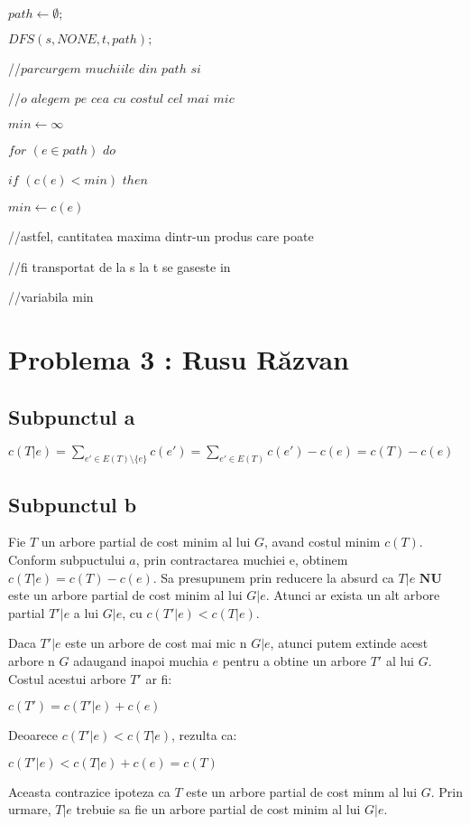 \documentclass{article}
\begin{document}
{{{    \\
    \par $path \leftarrow \emptyset;$
    \par $DFS(s, NONE, t, path);$
    \\
    \par //$parcurgem$ $muchiile$ $din$ $path$ $si$ 
    \par //$o$ $alegem$ $pe$ $cea$ $cu$ $costul$ $cel$ $mai$ $mic$
    \par $min \leftarrow \infty$
    \par $for$  $(e\in path)$ $do$
    \par \hspace*{1cm} $if$ $(c(e)<min)$ $then$
    \par \hspace*{1.5cm} $min \leftarrow c(e)$
    \par //astfel, cantitatea maxima dintr-un produs care poate
    \par //fi transportat de la s la t se gaseste in 
    \par //variabila min 

}

\section*{\fontsize{20}{50}\selectfont Problema 3 : Rusu Răzvan}
\subsection*{\fontsize{16}{30}\selectfont Subpunctul a}
{\fontsize{14}{16}\selectfont 

\centerline {$ c(T|e) = \sum_{ e'\in E(T)\setminus \lbrace e \rbrace } c(e') = \sum_{ e'\in E(T) } c(e') - c(e) = c(T) - c(e)$ }
}

\subsection*{\fontsize{16}{30}\selectfont Subpunctul b}
{\fontsize{14}{16}\selectfont 
    Fie $T$ un arbore partial de cost minim al lui $G$, avand costul minim $c(T)$. Conform subpuctului $a$, prin contractarea muchiei e, obtinem $c(T|e) = c(T) - c(e)$.
    Sa presupunem prin reducere la absurd ca $T|e$ $\mathbf{N} \mathbf{U}$ este un arbore partial de cost minim al lui $G|e$. Atunci ar exista un alt arbore partial $T'|e$ a lui $G|e$, cu $c(T'|e) < c(T|e)$.
    \par Daca $T'|e$ este un arbore de cost mai mic n $G|e$, atunci putem extinde acest arbore n $G$ adaugand inapoi muchia $e$ pentru a obtine un arbore $T'$ al lui $G$. Costul acestui arbore $T'$ ar fi:
    \par \centerline { $c(T') = c(T'|e) + c(e)$ }
    \par Deoarece $c(T'|e) < c(T|e)$, rezulta ca:
    \par \centerline {$c(T'|e) < c(T|e) + c(e) = c(T) $}
    \par Aceasta contrazice ipoteza ca $T$ este un arbore partial de cost minm al lui $G$. Prin urmare, $T|e$ trebuie sa fie un arbore partial de cost minim al lui $G|e$.
    }

}}
\end{document}
